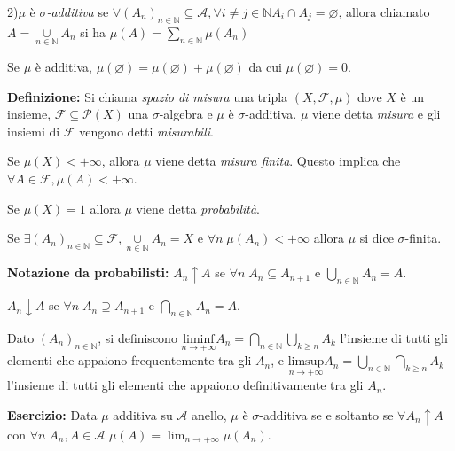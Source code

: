 2)$\mu$ è {\it $\sigma$-additiva} se $\forall (A_n)_{n\in\mathbb{N}}\subseteq \mathcal{A}, \forall i\neq j \in \mathbb{N} A_i\cap A_j =\varnothing$, allora chiamato $A=\underset{n\in\mathbb{N}}{\cup}A_n$ si ha $\mu(A)=\sum\limits_{n\in\mathbb{N}} \mu(A_n)$
 
\vspace{0.3cm}

\Oss Se $\mu$ è additiva, $\mu(\varnothing)=\mu(\varnothing)+\mu(\varnothing)$ da cui $\mu(\varnothing)=0$.
\vspace{0.3cm}


{\bf Definizione: } Si chiama {\it spazio di misura} una tripla $(X,\mathcal{F}, \mu)$ dove $X$ è un insieme, $\mathcal{F}\subseteq \mathscr{P}(X)$ una $\sigma$-algebra e $\mu$ è $\sigma$-additiva. $\mu$ viene detta {\it misura} e gli insiemi di $\mathcal{F}$ vengono detti {\it misurabili}.

Se $\mu(X)<+\infty$, allora $\mu$ viene detta {\it misura finita}. Questo implica che $\forall A \in \mathcal{F}, \mu(A) < +\infty$.

Se $\mu(X)=1$ allora $\mu$ viene detta {\it probabilità}.

Se $\exists (A_n)_{n\in\mathbb{N}}\subseteq\mathcal{F}, \underset{n\in\mathbb{N}}{\cup}A_n=X$ e $\forall n \; \mu(A_n) <+\infty$ allora $\mu$ si dice $\sigma$-finita.
\vspace{0.3cm}

{\bf Notazione da probabilisti: } $A_n \uparrow A$ se $\forall n \; A_n \subseteq A_{n+1}$ e $\underset{n\in \mathbb{N}}{\bigcup}A_n =A$.

$A_n \downarrow A$ se $\forall n \; A_n \supseteq A_{n+1}$ e $\underset{n\in \mathbb{N}}{\bigcap}A_n =A$.

Dato $(A_n)_{n\in\mathbb{N}}$, si definiscono $\underset{n\rightarrow +\infty}{\text{liminf}}A_n=\underset{n\in\mathbb{N}}{\bigcap}\underset{k\geq n}{\bigcup}A_k$ l'insieme di tutti gli elementi che appaiono frequentemente tra gli $A_n$, e $\underset{n\rightarrow +\infty}{\text{limsup}}A_n=\underset{n\in\mathbb{N}}{\bigcup}\underset{k\geq n}{\bigcap}A_k$ l'insieme di tutti gli elementi che appaiono definitivamente tra gli $A_n$.
\vspace{0.3cm}


{\bf Esercizio: } Data $\mu$ additiva su $\mathcal{A}$ anello, $\mu$ è $\sigma$-additiva se e soltanto se $\forall A_n \uparrow A$ con $\forall n\; A_n,A \in \mathcal{A}$ $\mu(A)=\lim_{n\rightarrow +\infty} \mu(A_n)$.
\vspace{0.3cm}

